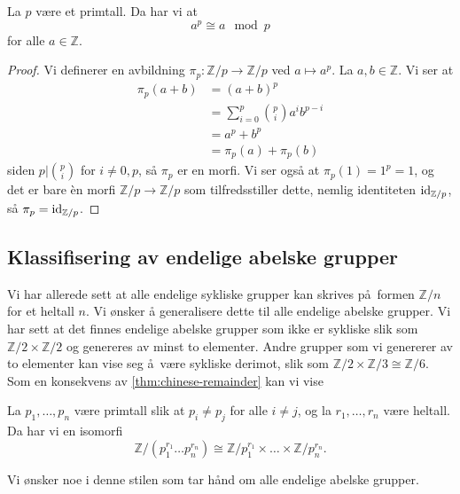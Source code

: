 \begin{corollary}\label{thm:fermat}
    La $p$ være et primtall.
    Da har vi at
    \[
        a^p \cong a \mod p
    \]
    for alle $a\in \mathbb Z$.
\end{corollary}
\begin{proof}
    Vi definerer en avbildning $\pi_p\colon \mathbb Z / p\to\mathbb Z / p$
    ved $a\mapsto a^p$.
    La $a,b\in \mathbb Z$.
    Vi ser at
    \[\begin{aligned}
        \pi_p(a + b)
        &= (a + b)^p
        \\
        &= \sum_{i = 0}^p \binom p i a^i b^{p - i}
        \\
        &= a^p + b^p
        \\
        &= \pi_p(a) + \pi_p(b)
    \end{aligned}\]
    siden $p|\binom p i$ for $i\neq 0, p$,
    så $\pi_p$ er en morfi.
    Vi ser også at $\pi_p(1) = 1^p = 1$,
    og det er bare \`en morfi $\mathbb Z / p\to \mathbb Z / p$
    som tilfredsstiller dette, nemlig identiteten $\operatorname{id}_{\mathbb Z / p}$,
    så $\pi_p = \operatorname{id}_{\mathbb Z / p}$.
\end{proof}

\subsection{Klassifisering av endelige abelske grupper}
Vi har allerede sett at alle endelige sykliske grupper kan skrives på formen
$\mathbb Z / n$ for et heltall $n$.
Vi ønsker å generalisere dette til alle endelige abelske grupper.
Vi har sett at det finnes endelige abelske grupper som ikke er sykliske
slik som $\mathbb Z / 2\times \mathbb Z / 2$ og genereres av minst to elementer.
Andre grupper som vi genererer av to elementer kan vise seg å være sykliske derimot,
slik som $\mathbb Z / 2\times \mathbb Z / 3 \cong \mathbb Z / 6$.
Som en konsekvens av \cref{thm:chinese-remainder} kan vi vise
\begin{corollary}\label{thm:cyclic-refactoring}
    La $p_1,\dots,p_n$ være primtall slik at $p_i \neq p_j$
    for alle $i\neq j$,
    og la $r_1,\dots,r_n$ være heltall.
    Da har vi en isomorfi
    \[
        \mathbb Z / (p_1^{r_1}\dots p_n^{r_n})
        \cong
        \mathbb Z / p_1^{r_1}\times\dots\times\mathbb Z / p_n^{r_n}.
    \]
\end{corollary}

Vi ønsker noe i denne stilen som tar hånd om alle endelige abelske grupper.

